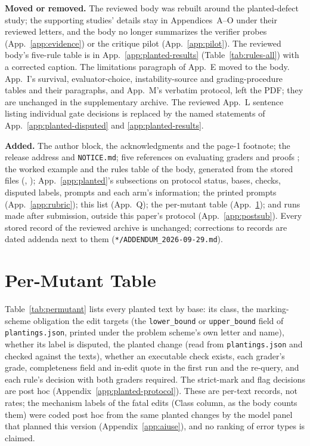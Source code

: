 \textbf{Moved or removed.} The reviewed body was rebuilt around the planted-defect study; the supporting studies' details stay in Appendices~A--O under their reviewed letters, and the body no longer summarizes the verifier probes (App.~\ref{app:evidence}) or the critique pilot (App.~\ref{app:pilot}). The reviewed body's five-rule table is in App.~\ref{app:planted-results} (Table~\ref{tab:rules-all}) with a corrected caption. The limitations paragraph of App.~E moved to the body. App.~I's survival, evaluator-choice, instability-source and grading-procedure tables and their paragraphs, and App.~M's verbatim protocol, left the PDF; they are unchanged in the supplementary archive. The reviewed App.~L sentence listing individual gate decisions is replaced by the named statements of App.~\ref{app:planted-disputed} and \ref{app:planted-results}.

\textbf{Added.} The author block, the acknowledgments and the page-1 footnote; the release address and \texttt{NOTICE.md}; five references on evaluating graders and proofs \citep{mahdavi2025brains,doddapaneni2024fbi,mcaleese2024criticgpt,dekoninck2025opc,panickssery2024self}; the worked example and the rules table of the body, generated from the stored files (, ); App.~\ref{app:planted}'s subsections on protocol status, bases, checks, disputed labels, prompts and each arm's information; the printed prompts (App.~\ref{app:rubric}); this list (App.~Q); the per-mutant table (App.~\ref{app:permutant}); and runs made after submission, outside this paper's protocol (App.~\ref{app:postsub}). Every stored record of the reviewed archive is unchanged; corrections to records are dated addenda next to them (\texttt{*/\allowbreak ADDENDUM\_2026-09-29.md}).

\clearpage
\section{Per-Mutant Table}
\label{app:permutant}
Table~\ref{tab:permutant} lists every planted text by base: its class, the marking-scheme obligation the edit targets (the \texttt{lower\_bound} or \texttt{upper\_bound} field of \texttt{plantings.json}, printed under the problem scheme's own letter and name), whether its label is disputed, the planted change (read from \texttt{plantings.json} and checked against the texts), whether an executable check exists, each grader's grade, completeness field and in-edit quote in the first run and the re-query, and each rule's decision with both graders required. The strict-mark and flag decisions are post hoc (Appendix~\ref{app:planted-protocol}). These are per-text records, not rates; the mechanism labels of the fatal edits (Class column, as the body counts them) were coded post hoc from the same planted changes by the model panel that planned this version (Appendix~\ref{app:aiuse}), and no ranking of error types is claimed.


